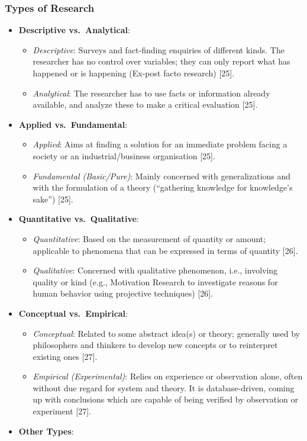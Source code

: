 \documentclass[
]{article}
\providecommand{\tightlist}{%
  \setlength{\itemsep}{0pt}\setlength{\parskip}{0pt}}
\begin{document}
\subsubsection{Types of Research}\label{types-of-research}

\begin{itemize}
\tightlist
\item
  \textbf{Descriptive vs.~Analytical}:

  \begin{itemize}
  \tightlist
  \item
    \emph{Descriptive}: Surveys and fact-finding enquiries of different
    kinds. The researcher has no control over variables; they can only
    report what has happened or is happening (Ex-post facto research)
    {[}25{]}.
  \item
    \emph{Analytical}: The researcher has to use facts or information
    already available, and analyze these to make a critical evaluation
    {[}25{]}.
  \end{itemize}
\item
  \textbf{Applied vs.~Fundamental}:

  \begin{itemize}
  \tightlist
  \item
    \emph{Applied}: Aims at finding a solution for an immediate problem
    facing a society or an industrial/business organisation {[}25{]}.
  \item
    \emph{Fundamental (Basic/Pure)}: Mainly concerned with
    generalizations and with the formulation of a theory (``gathering
    knowledge for knowledge's sake'') {[}25{]}.
  \end{itemize}
\item
  \textbf{Quantitative vs.~Qualitative}:

  \begin{itemize}
  \tightlist
  \item
    \emph{Quantitative}: Based on the measurement of quantity or amount;
    applicable to phenomena that can be expressed in terms of quantity
    {[}26{]}.
  \item
    \emph{Qualitative}: Concerned with qualitative phenomenon, i.e.,
    involving quality or kind (e.g., Motivation Research to investigate
    reasons for human behavior using projective techniques) {[}26{]}.
  \end{itemize}
\item
  \textbf{Conceptual vs.~Empirical}:

  \begin{itemize}
  \tightlist
  \item
    \emph{Conceptual}: Related to some abstract idea(s) or theory;
    generally used by philosophers and thinkers to develop new concepts
    or to reinterpret existing ones {[}27{]}.
  \item
    \emph{Empirical (Experimental)}: Relies on experience or observation
    alone, often without due regard for system and theory. It is
    database-driven, coming up with conclusions which are capable of
    being verified by observation or experiment {[}27{]}.
  \end{itemize}
\item
  \textbf{Other Types}:


\end{itemize}
\end{document}
